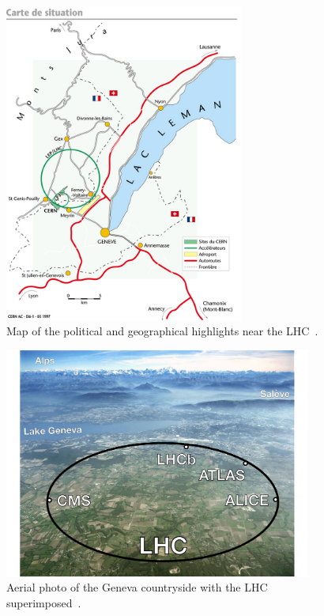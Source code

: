 \begin{figure}[ht]
 \begin{center}
    \includegraphics[width=0.70\textwidth]{figures/experiment/lhc-pho-1997-169.jpg}
      \end{center}
\caption{Map of the political and geographical highlights near the LHC~\cite{Dailler:842399}.}
\label{fig:lhc_mapwithcities}
\end{figure}

\begin{figure}[ht]
 \begin{center}
    \includegraphics[width=0.90\textwidth]{figures/experiment/lhc-switzerland.pdf}
      \end{center}
\caption{Aerial photo of the Geneva countryside with the LHC superimposed~\cite{Tuna:thesis}.}
\label{fig:lhc_map_tuna}
\end{figure}


